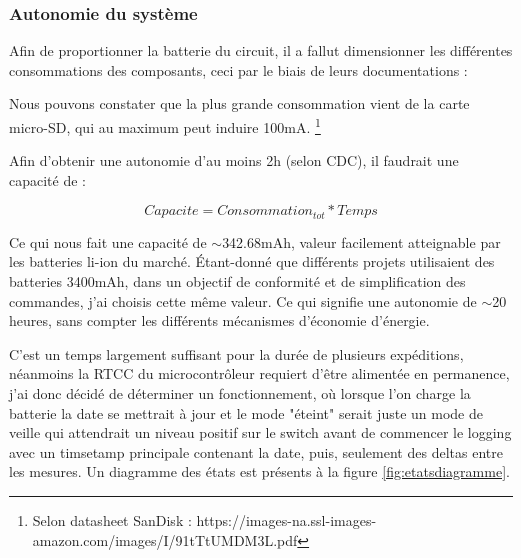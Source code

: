 {	\clearpage
	\subsubsection{Autonomie du système} \label{sssec:SysAutonomie}
	{
		Afin de proportionner la batterie du circuit, il a fallut dimensionner les différentes consommations des composants, ceci par le biais de leurs documentations :
		
		\begin{center}
			   \fbox{\textit{\textcolor{red}{Carte-SD - 100mA}}}    
		\end{center}
		
		Nous pouvons constater que la plus grande consommation vient de la carte micro-SD, qui au maximum peut induire 100mA. \footnote{Selon datasheet SanDisk : https://images-na.ssl-images-amazon.com/images/I/91tTtUMDM3L.pdf}
		
		
		Afin d'obtenir une autonomie d'au moins 2h (selon CDC), il faudrait une capacité de :
		
		\begin{equation}
			Capacite = Consommation_{tot} * Temps
		\end{equation}
		
		Ce qui nous fait une capacité de $\sim$342.68mAh, valeur facilement atteignable par les batteries li-ion du marché. Étant-donné que différents projets utilisaient des batteries 3400mAh, dans un objectif de conformité et de simplification des commandes, j'ai choisis cette même valeur.
		Ce qui signifie une autonomie de $\sim$20 heures, sans compter les différents mécanismes d'économie d'énergie.
		
		C'est un temps largement suffisant pour la durée de plusieurs expéditions, néanmoins la RTCC du microcontrôleur requiert d'être alimentée en permanence, j'ai donc décidé de déterminer un fonctionnement, où lorsque l'on charge la batterie la date se mettrait à jour et le mode "éteint" serait juste un mode de veille qui attendrait un niveau positif sur le switch avant de commencer le logging avec un timsetamp principale contenant la date, puis, seulement des deltas entre les mesures. Un diagramme des états est présents à la figure \ref{fig:etatsdiagramme}.
		
}}
